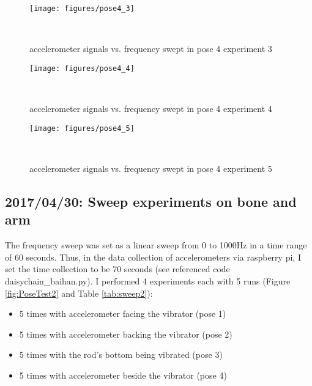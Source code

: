 \documentclass{sigchi}
\begin{document}
\begin{figure*}
  \centering
  \texttt{[image: figures/pose4\_3]}
  \caption{accelerometer signals vs. frequency swept in pose 4 experiment 3}
    ~\label{fig:pose4_3}
\end{figure*}

\begin{figure*}
  \centering
  \texttt{[image: figures/pose4\_4]}
  \caption{accelerometer signals vs. frequency swept in pose 4 experiment 4}
    ~\label{fig:pose4_4}
\end{figure*}

\begin{figure*}
  \centering
  \texttt{[image: figures/pose4\_5]}
  \caption{accelerometer signals vs. frequency swept in pose 4 experiment 5}
    ~\label{fig:pose4_5}
\end{figure*}

\subsection{2017/04/30: Sweep experiments on bone and arm} 

The frequency sweep was set as a linear sweep from 0 to 1000Hz in a time range of 60 seconds. Thus, in the data collection of accelerometers via raspberry pi, I set the time collection to be 70 seconds (see referenced code daisychain\_baihan.py). I performed 4 experiments each with 5 runs (Figure \ref{fig:PoseTest2} and Table \ref{tab:sweep2}): 
\begin{itemize}
\item 5 times with accelerometer facing the vibrator (pose 1)
\item 5 times with accelerometer backing the vibrator (pose 2)
\item 5 times with the rod's bottom being vibrated (pose 3)
\item 5 times with accelerometer beside the vibrator (pose 4)
\end{itemize}
\end{document}
